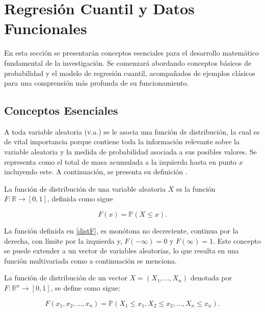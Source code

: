 \chapter{Regresión Cuantil y Datos Funcionales}\label{RegCuanDatosFun}

En esta sección se presentarán conceptos esenciales para el desarrollo matemático fundamental de la investigación. Se comenzará abordando conceptos básicos de probabilidad y el modelo de regresión cuantil, acompañados de ejemplos clásicos para una comprensión más profunda de su funcionamiento.



\section{Conceptos Esenciales}

A toda variable aleatoria (v.a.) se le asocia una función de distribución, la cual es de vital importancia porque contiene toda la información relevante sobre la variable aleatoria y la medida de probabilidad asociada a sus posibles valores. Se representa como el total de masa acumulada a la izquierda hasta en punto $x$ incluyendo este. A continuación, se presenta su definición \cite{Rincon}.

\begin{defn}
    La función de distribución de una variable aleatoria $X$ es la función $F: \mathbb{R} \to [0, 1]$, definida como sigue

    \begin{equation}\label{distF}
        F(x) = \mathbb{P}(X \leq x).
    \end{equation}
\end{defn}

La función definida en \eqref{distF}, es monótona no decreciente, continua por la derecha, con límite por la izquierda y, $F(-\infty) = 0$ y $F(\infty) = 1$. Este concepto se puede extender a un vector de variables aleatorias, lo que resulta en una función multivariada como a continuación se menciona. 

\begin{defn}
    La función de distribución de un vector $X = (X_1, \dots , X_n)$ denotada por $F: \mathbb{R}^{n} \to [0, 1]$, se define como sigue:

    \begin{equation}
        F(x_1, x_2, \dots, x_n) = \mathbb{P}\left ( X_1 \leq x_1, X_2 \leq x_2, \dots, X_n \leq x_n \right ).
    \end{equation}
\end{defn}

